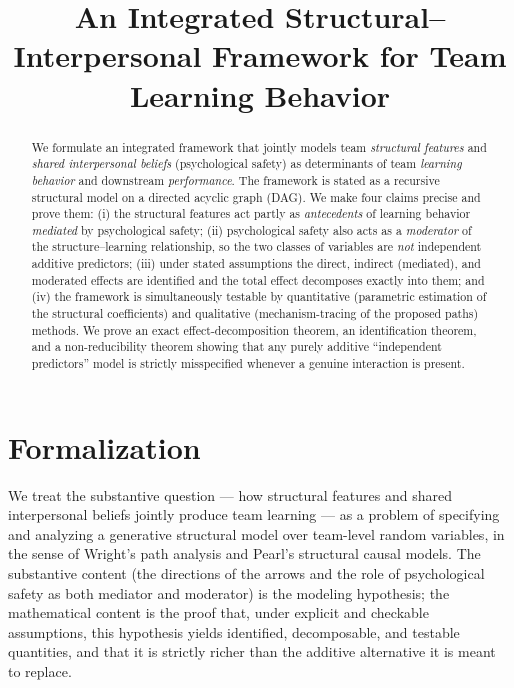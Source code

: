 \documentclass{amsart}
\theoremstyle{definition}
\theoremstyle{plain}
\begin{document}
\title{An Integrated Structural--Interpersonal Framework for Team Learning Behavior}
\maketitle

\begin{abstract}
We formulate an integrated framework that jointly models team \emph{structural features}
and \emph{shared interpersonal beliefs} (psychological safety) as determinants of team
\emph{learning behavior} and downstream \emph{performance}. The framework is stated as a
recursive structural model on a directed acyclic graph (DAG). We make four claims precise
and prove them: (i) the structural features act partly as \emph{antecedents} of learning
behavior \emph{mediated} by psychological safety; (ii) psychological safety also acts as a
\emph{moderator} of the structure--learning relationship, so the two classes of variables
are \emph{not} independent additive predictors; (iii) under stated assumptions the
direct, indirect (mediated), and moderated effects are identified and the total effect
decomposes exactly into them; and (iv) the framework is simultaneously testable by
quantitative (parametric estimation of the structural coefficients) and qualitative
(mechanism-tracing of the proposed paths) methods. We prove an exact effect-decomposition
theorem, an identification theorem, and a non-reducibility theorem showing that any purely
additive ``independent predictors'' model is strictly misspecified whenever a genuine
interaction is present.
\end{abstract}

\section{Formalization}

We treat the substantive question --- how structural features and shared interpersonal
beliefs jointly produce team learning --- as a problem of specifying and analyzing a
generative structural model over team-level random variables, in the sense of Wright's path
analysis and Pearl's structural causal models. The substantive content (the directions of
the arrows and the role of psychological safety as both mediator and moderator) is the
modeling hypothesis; the mathematical content is the proof that, under explicit and
checkable assumptions, this hypothesis yields identified, decomposable, and testable
quantities, and that it is strictly richer than the additive alternative it is meant to
replace.
\end{document}
